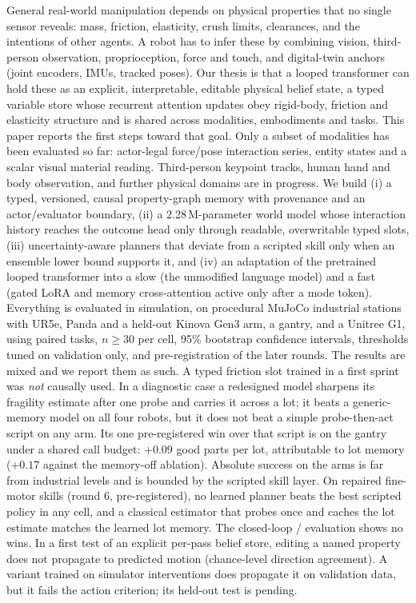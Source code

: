General real-world manipulation depends on physical properties that no single sensor reveals: mass,
friction, elasticity, crush limits, clearances, and the intentions of other agents. A robot has to infer
these by combining vision, third-person observation, proprioception, force and touch, and digital-twin anchors
(joint encoders, IMUs, tracked poses). Our thesis is that a looped transformer can hold these as an explicit,
interpretable, editable physical belief state, a typed variable store whose recurrent attention updates obey
rigid-body, friction and elasticity structure and is shared across modalities, embodiments and tasks.
This paper reports the first steps toward that goal. Only a subset of modalities has been evaluated so far:
actor-legal force/pose interaction series, entity states and a scalar visual material reading. Third-person
keypoint tracks, human hand and body observation, and further physical domains are in progress.
We build (i) a typed, versioned, causal property-graph memory with provenance and an actor/evaluator
boundary, (ii) a 2.28\,M-parameter world model whose interaction history reaches the outcome head only through
readable, overwritable typed slots, (iii) uncertainty-aware planners that deviate from a scripted skill only
when an ensemble lower bound supports it, and (iv) an adaptation of the pretrained looped transformer
\inkling{} into a slow \sysII{} (the unmodified language model) and a fast \sysI{} (gated LoRA and memory
cross-attention active only after a mode token).
Everything is evaluated in simulation, on procedural MuJoCo industrial stations with UR5e, Panda and a held-out
Kinova Gen3 arm, a gantry, and a Unitree G1, using paired tasks, $n\ge 30$ per cell, 95\% bootstrap confidence
intervals, thresholds tuned on validation only, and pre-registration of the later rounds.
The results are mixed and we report them as such.
A typed friction slot trained in a first sprint was \emph{not} causally used.
In a diagnostic case a redesigned model sharpens its fragility estimate after one probe and carries it across a lot; it beats a
generic-memory model on all four robots, but it does not beat a simple probe-then-act script on any arm.
Its one pre-registered win over that script is on the gantry under a shared call budget:
$+0.09$  good parts per lot, attributable to lot memory ($+0.17$  against the
memory-off ablation).
Absolute success on the arms is far from industrial levels and is bounded by the scripted skill layer.
On repaired fine-motor skills (round 6, pre-registered), no learned planner beats the best scripted policy in any
cell, and a classical estimator that probes once and caches the lot estimate matches the learned lot memory.
The closed-loop \sysI/\sysII{} evaluation shows no wins.
In a first test of an explicit per-pass belief store, editing a named property does not propagate to predicted
motion (chance-level direction agreement). A variant trained on simulator interventions does propagate it on
validation data, but it fails the action criterion; its held-out test is pending.
